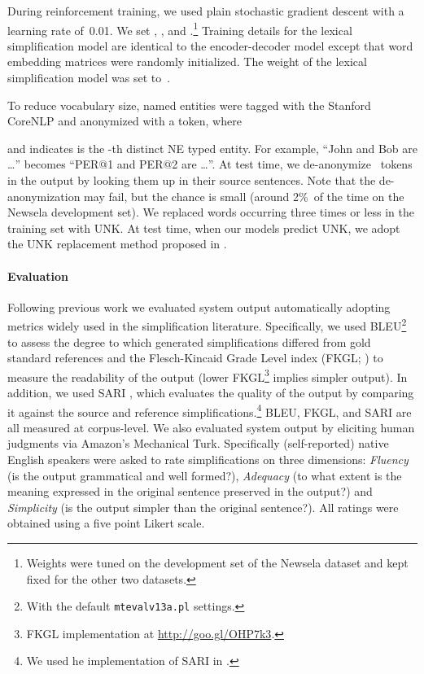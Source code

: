 \documentclass[11pt,letterpaper]{article}
\begin{document}
During reinforcement training, we used plain stochastic gradient
descent with a learning rate of~0.01. We set ,
,  and
.\footnote{Weights were tuned on the development set
	of the Newsela dataset and kept fixed for the other two datasets.}
Training details for the lexical simplification model are identical to
the encoder-decoder model except that word embedding matrices were
randomly initialized. The weight of the lexical simplification model
was set to~.

To reduce vocabulary size, named entities were tagged with the
Stanford CoreNLP \cite{manning-EtAl:2014:P14-5} and anonymized with a
 token, where

and  indicates  is the -th distinct NE typed
entity. For example, ``John and Bob are \dots'' becomes ``PER@1 and
PER@2 are \dots''. At test time, we de-anonymize~ tokens
in the output by looking them up in their source sentences. Note that
the de-anonymization may fail, but the chance is small (around 2\%~of
the time on the Newsela development set). We replaced words occurring
three times or less in the training set with UNK. At test time, when
our models predict UNK, we adopt the UNK replacement method proposed
in \citet{jean2015montreal}.


\paragraph{Evaluation}
Following previous work \cite{woodsend-lapata:2011:EMNLP,Xu_TACL16} we
evaluated system output automatically adopting metrics widely used in
the simplification literature. Specifically, we used
BLEU\footnote{With the default {\tt mtevalv13a.pl} settings.}
\cite{papineni:2002} to assess the degree to which generated
simplifications differed from gold standard references and the
Flesch-Kincaid Grade Level index (FKGL; \citealt{kincaid:1975}) to
measure the readability of the output (lower FKGL\footnote{FKGL implementation at {\small \url{http://goo.gl/OHP7k3}}.} implies
simpler output). In addition, we used SARI \cite{Xu_TACL16}, which
evaluates the quality of the output by comparing it against the source
and reference simplifications.\footnote{We used he implementation of
  SARI in .}  BLEU, FKGL, and SARI are all measured
at corpus-level.
We also evaluated system output by eliciting human judgments via
Amazon's Mechanical Turk. Specifically (self-reported) native English
speakers were asked to rate simplifications on three dimensions:
\emph{Fluency} (is the output grammatical and well formed?),
\emph{Adequacy} (to what extent is the meaning expressed in the
original sentence preserved in the output?) and \emph{Simplicity} (is
the output simpler than the original sentence?). All ratings were
obtained using a five point Likert scale.
\end{document}
